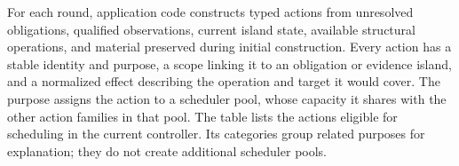 For each round, application code constructs typed actions from unresolved obligations, qualified observations, current island state, available structural operations, and material preserved during initial construction. Every action has a stable identity and purpose, a scope linking it to an obligation or evidence island, and a normalized effect describing the operation and target it would cover. The purpose assigns the action to a scheduler pool, whose capacity it shares with the other action families in that pool. The table lists the actions eligible for scheduling in the current controller. Its categories group related purposes for explanation; they do not create additional scheduler pools.

\Needspace{0.35\textheight}

\begingroup
\small
\setlength{\tabcolsep}{3pt}
\renewcommand{\arraystretch}{1.12}

